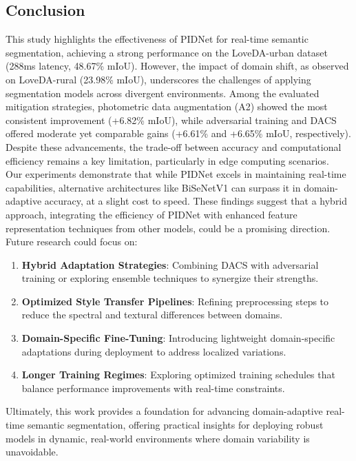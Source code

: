 \documentclass{article}
\begin{document}
\begin{multicols}{2}
\begin{table}[H]
		\end{table}



		\section{Conclusion}
		\justifying


		This study highlights the effectiveness of PIDNet for real-time semantic segmentation, achieving a strong performance on the LoveDA-urban dataset (288ms latency, 48.67\% mIoU). However, the impact of domain shift, as observed on LoveDA-rural (23.98\% mIoU), underscores the challenges of applying segmentation models across divergent environments. Among the evaluated mitigation strategies, photometric data augmentation (A2) showed the most consistent improvement (+6.82\% mIoU), while adversarial training and DACS offered moderate yet comparable gains (+6.61\% and +6.65\% mIoU, respectively). Despite these advancements, the trade-off between accuracy and computational efficiency remains a key limitation, particularly in edge computing scenarios. 
		\\
		Our experiments demonstrate that while PIDNet excels in maintaining real-time capabilities, alternative architectures like BiSeNetV1 can surpass it in domain-adaptive accuracy, at a slight cost to speed. These findings suggest that a hybrid approach, integrating the efficiency of PIDNet with enhanced feature representation techniques from other models, could be a promising direction.
		Future research could focus on:

		\begin{enumerate}
			\item \textbf {Hybrid Adaptation Strategies}: Combining DACS with adversarial training or exploring ensemble techniques to synergize their strengths.
			\item \textbf {Optimized Style Transfer Pipelines}: Refining preprocessing steps to reduce the spectral and textural differences between domains.
			\item \textbf {Domain-Specific Fine-Tuning}: Introducing lightweight domain-specific adaptations during deployment to address localized variations.
			\item \textbf {Longer Training Regimes}: Exploring optimized training schedules that balance performance improvements with real-time constraints.
		\end{enumerate}
		
		Ultimately, this work provides a foundation for advancing domain-adaptive real-time semantic segmentation, offering practical insights for deploying robust models in dynamic, real-world environments where domain variability is unavoidable.
		

		
	\end{multicols}
	
	
	
	
\end{document}
